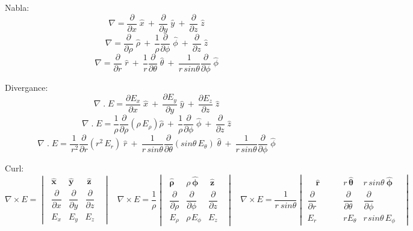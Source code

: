 \par
Nabla:
$$ \nabla = \frac{\partial}{\partial x}\;\hat{x} ~+~ \frac{\partial}{\partial y}\;\hat{y} ~+~ \frac{\partial}{\partial z}\;\hat{z} $$
$$ \nabla = \frac{\partial}{\partial \rho}\;\hat{\rho} ~+~ \frac{1}{\rho}\frac{\partial}{\partial \phi}\;\hat{\phi} ~+~ \frac{\partial}{\partial z}\;\hat{z} $$
$$ \nabla = \frac{\partial}{\partial r}\;\hat{r} ~+~ \frac{1}{r}\frac{\partial}{\partial \theta}\;\hat{\theta} ~+~ \frac{1}{r\,sin\theta}\frac{\partial}{\partial \phi}\;\hat{\phi} $$
\par
Divergance:
$$ \nabla\;.\;E = \frac{\partial E_x}{\partial x}\;\hat{x} ~+~ \frac{\partial E_y}{\partial y}\;\hat{y} ~+~ \frac{\partial E_z}{\partial z}\;\hat{z} $$
$$ \nabla\;.\;E = \frac{1}{\rho} \frac{\partial}{\partial \rho} (\rho \,E_{\rho}) \hat{\rho} ~+~ \frac{1}{\rho}\frac{\partial}{\partial \phi}\;\hat{\phi} ~+~ \frac{\partial}{\partial z}\;\hat{z} $$
$$ \nabla\;.\;E = \frac {1}{\,r^2}\frac{\partial}{\partial r} (r^2 \, E_r)\;\hat{r} ~+~ \frac{1}{r\,sin\theta}\frac{\partial}{\partial \theta}(sin\theta\, E_{\theta})\;\hat{\theta} ~+~ \frac{1}{r\,sin\theta}\frac{\partial}{\partial \phi}\;\hat{\phi} $$
\par
Curl:
$$ \nabla \times E =  \begin{vmatrix}
\;\hat{\boldsymbol{x}} & \hat{\boldsymbol{y}} & ~\hat{\boldsymbol{z}}\;\;\\[0.25em]
\;\dfrac{\partial}{\partial x} & \dfrac{\partial}{\partial y} & \dfrac{\partial}{\partial z}\;\;\\[0.8em]
\;E_x & E_y & E_z\;\;
\end{vmatrix} ~~~~
 \nabla \times E = \frac{1}{\rho} \begin{vmatrix}
\;\hat{\boldsymbol{\rho}} & \rho\,\hat{\boldsymbol{\phi}} & ~\hat{\boldsymbol{z}}\;\;\\[0.25em]
\;\dfrac{\partial}{\partial \rho} & \dfrac{\partial}{\partial \phi} & \dfrac{\partial}{\partial z}\;\;\\[0.8em]
\;E_{\rho} & \rho\hspace{1pt}E_{\phi} & E_z\;\;
\end{vmatrix} ~~~~
 \nabla \times E = \frac{1}{r~ sin \theta} \begin{vmatrix}
\quad\hat{\boldsymbol{r}}\quad\quad & r \, \hat{\boldsymbol{\theta}} & r\, sin \theta \:\hat{\boldsymbol{\phi}}\;\;\\[0.25em]
\dfrac{\partial}{\partial r} & \dfrac{\partial}{\partial \theta} & \dfrac{\partial}{\partial \phi}\;\;\\[0.8em]
E_{r} & r E_{\theta} & r \hspace{1pt} sin \theta \, E_{\phi}\;\;
\end{vmatrix}$$
\par
\begin{minipage}[b]{.49\textwidth}
\lipsum[1-2]
\end{minipage}%
\hspace{.02\textwidth}
\begin{minipage}[b]{.49\textwidth}
\lipsum[1-2]
\end{minipage}%
\par
\setlength{\parindent}{0.0cm} %
